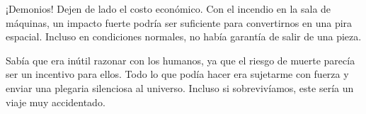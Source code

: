 ¡Demonios! Dejen de lado el costo económico. Con el incendio en la sala de máquinas, un impacto fuerte podría ser suficiente para convertirnos en una pira espacial. Incluso en condiciones normales, no había garantía de salir de una pieza.

Sabía que era inútil razonar con los humanos, ya que el riesgo de muerte parecía ser un incentivo para ellos. Todo lo que podía hacer era sujetarme con fuerza y enviar una plegaria silenciosa al universo. Incluso si sobrevivíamos, este sería un viaje muy accidentado.